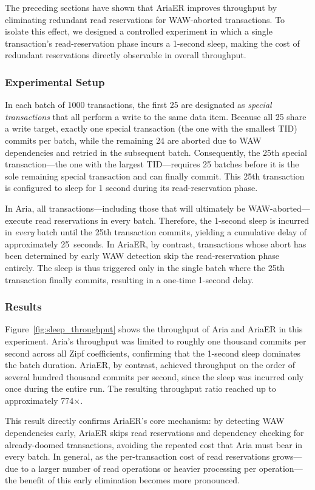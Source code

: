 \documentclass[english,preprint,JIP]{ipsj}
\begin{document}
The preceding sections have shown that AriaER improves throughput by eliminating redundant read reservations for WAW-aborted transactions.
To isolate this effect, we designed a controlled experiment in which a single transaction's read-reservation phase incurs a 1-second sleep, making the cost of redundant reservations directly observable in overall throughput.

\subsubsection{Experimental Setup}
In each batch of 1000 transactions, the first 25 are designated as \emph{special transactions} that all perform a write to the same data item. Because all 25 share a write target, exactly one special transaction (the one with the smallest TID) commits per batch, while the remaining 24 are aborted due to WAW dependencies and retried in the subsequent batch. Consequently, the 25th special transaction---the one with the largest TID---requires 25 batches before it is the sole remaining special transaction and can finally commit. This 25th transaction is configured to sleep for 1 second during its read-reservation phase.

In Aria, all transactions---including those that will ultimately be WAW-aborted---execute read reservations in every batch. Therefore, the 1-second sleep is incurred in \emph{every} batch until the 25th transaction commits, yielding a cumulative delay of approximately 25~seconds. In AriaER, by contrast, transactions whose abort has been determined by early WAW detection skip the read-reservation phase entirely. The sleep is thus triggered only in the single batch where the 25th transaction finally commits, resulting in a one-time 1-second delay.

\subsubsection{Results}
Figure~\ref{fig:sleep_throughput} shows the throughput of Aria and AriaER in this experiment. Aria's throughput was limited to roughly one thousand commits per second across all Zipf coefficients, confirming that the 1-second sleep dominates the batch duration. AriaER, by contrast, achieved throughput on the order of several hundred thousand commits per second, since the sleep was incurred only once during the entire run. The resulting throughput ratio reached up to approximately 774$\times$.

This result directly confirms AriaER's core mechanism: by detecting WAW dependencies early, AriaER skips read reservations and dependency checking for already-doomed transactions, avoiding the repeated cost that Aria must bear in every batch. In general, as the per-transaction cost of read reservations grows---due to a larger number of read operations or heavier processing per operation---the benefit of this early elimination becomes more pronounced.
\end{document}
